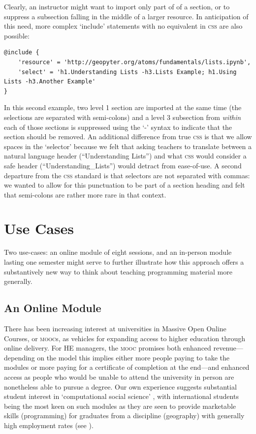 \documentclass[letter, 11pt,titlepage]{article}
\begin{document}
Clearly, an instructor might want to import only part of of a section, or to
suppress a subsection falling in the middle of a larger resource. In
anticipation of this need, more complex `include' statements with no equivalent
in \textsc{css} are also possible:

\begin{Verbatim}[fontsize=\small]
@include {
    'resource' = 'http://geopyter.org/atoms/fundamentals/lists.ipynb',
    'select' = 'h1.Understanding Lists -h3.Lists Example; h1.Using Lists -h3.Another Example'
}
\end{Verbatim}

In this second example, two level 1 section are imported at the same time (the
selections are separated with semi-colons) and a level 3 subsection from
\emph{within} each of those sections is suppressed using the `-' syntax to
indicate that the section should be removed. An additional difference from true
\textsc{css} is that we allow spaces in the `selector' because we felt that
asking teachers to translate between a natural language header (``Understanding
Lists'') and what \textsc{css} would consider a safe header
(``Understanding\_Lists'') would detract from ease-of-use. A second departure
from the \textsc{css} standard is that selectors are not separated with commas:
we wanted to allow for this punctuation to be part of a section heading and felt
that semi-colons are rather more rare in that context.

\section{Use Cases}\label{uses}

Two use-cases: an online module of eight sessions, and an in-person module
lasting one semester might serve to further illustrate how this approach offers
a substantively new way to think about teaching programming material more
generally.

\subsection{An Online Module}\label{an-online-module}

There has been increasing interest at universities in Massive Open Online
Courses, or \textsc{mooc}s, as vehicles for expanding access to higher education
through online delivery. For HE managers, the \textsc{mooc} promises both
enhanced revenue---depending on the model this implies either more people paying
to take the modules or more paying for a certificate of completion at the
end---and enhanced access as people who would be unable to attend the university
in person are nonetheless able to pursue a degree. Our own experience suggests
substantial student interest in `computational social science'
\citep{Lazer2009}, with international students being the most keen on such
modules as they are seen to provide marketable skills (programming) for
graduates from a discipline (geography) with generally high employment rates
(see \citeauthor{rgs2017} \citeyear{rgs2017}).
\end{document}
